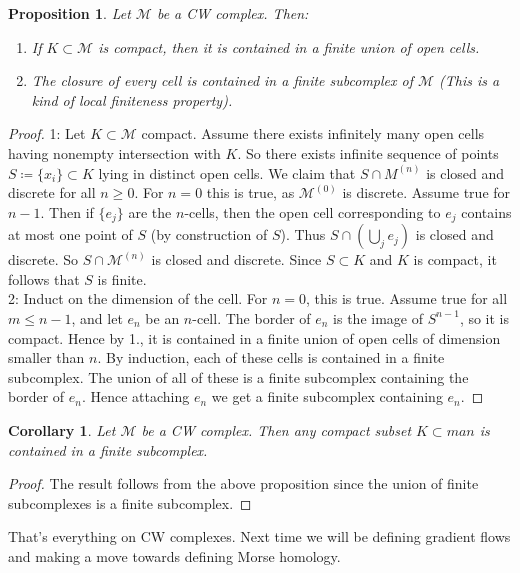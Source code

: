 \documentclass[10pt]{article}
\theoremstyle{plain}
\newtheorem{corollary}[thm]{Corollary}
\newtheorem{prop}[thm]{Proposition}
\theoremstyle{definition}
\newcommand{\man}{\mathcal{M}}
\begin{document}
\begin{prop}
   Let $\man$ be a CW complex. Then:
   \begin{enumerate}
       \item If $K\subset \man$ is compact, then it is contained in a finite union of open cells.
       \item The closure of every cell is contained in a finite subcomplex of $\man$ (This is a kind of local finiteness property).
   \end{enumerate}
\end{prop}

\begin{proof}
   1: Let $K\subset \man$ compact. Assume there exists infinitely many open cells having nonempty intersection with $K$. So there exists infinite sequence of points $S \coloneqq \{x_i\}\subset K$ lying in distinct open cells. We claim that $S\cap M^{(n)}$ is closed and discrete for all $n\geq 0$. For $n=0$ this is true, as $\man^{(0)}$ is discrete. Assume true for $n-1$. Then if $\{e_j\}$ are the $n$-cells, then the open cell corresponding to $e_j$ contains at most one point of $S$ (by construction of $S$). Thus $S\cap (\bigcup_j e_j)$ is closed and discrete. So $S\cap \man^{(n)}$ is closed and discrete. Since $S \subset K$ and $K$ is compact, it follows that $S$ is finite. \\
   2: Induct on the dimension of the cell. For $n=0$, this is true. Assume true for all $m\leq n-1$, and let $e_n$ be an $n$-cell. The border of $e_n$ is the image of $S^{n-1}$, so it is compact. Hence by 1., it is contained in a finite union of open cells of dimension smaller than $n$. By induction, each of these cells is contained in a finite subcomplex. The union of all of these is a finite subcomplex containing the border of $e_n$. Hence attaching $e_n$ we get a finite subcomplex containing $e_n$.
\end{proof}

\begin{corollary}
    Let $\man$ be a CW complex. Then any compact subset $K\subset man$ is contained in a finite subcomplex.
\end{corollary}

\begin{proof}
    The result follows from the above proposition since the union of finite subcomplexes is a finite subcomplex.
\end{proof}
That's everything on CW complexes. Next time we will be defining gradient flows and making a move towards defining Morse homology.
\end{document}
